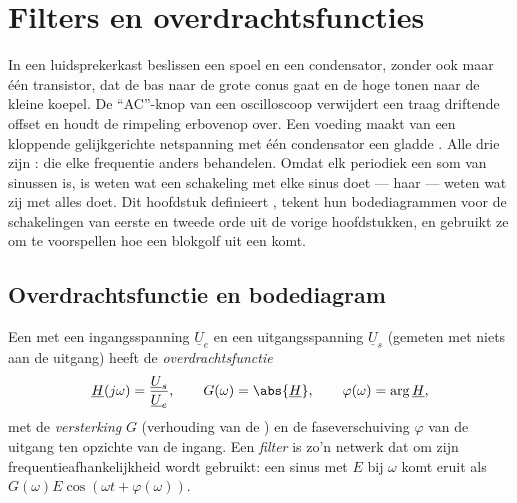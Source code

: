 \chapter{Filters en overdrachtsfuncties}\label{ch:b1:filters-transfer-functions}

In een luidsprekerkast beslissen een spoel en een condensator, zonder ook maar
één transistor, dat de bas naar de grote conus gaat en de hoge tonen naar de
kleine koepel. De ``AC''-knop van een oscilloscoop verwijdert een traag
driftende offset en houdt de rimpeling erbovenop over. Een voeding maakt van
een kloppende gelijkgerichte netspanning met één condensator een gladde .
Alle drie zijn \emph{}:  die elke frequentie
anders behandelen. Omdat elk periodiek  een som van sinussen is, is weten
wat een schakeling met elke sinus doet --- haar  --- weten
wat zij met alles doet. Dit hoofdstuk definieert , tekent
hun bodediagrammen voor de schakelingen van eerste en tweede orde uit de vorige
hoofdstukken, en gebruikt ze om te voorspellen hoe een blokgolf uit een 
komt.

\section{Overdrachtsfunctie en bodediagram}

\begin{definition}[Overdrachtsfunctie]\label{def:b1:filters-transfer-functions:H}
Een  met een ingangsspanning $\underline U_e$ en een
uitgangsspanning $\underline U_s$ (gemeten met niets aan de uitgang) heeft
de \emph{overdrachtsfunctie}
\[
\underline H(j\omega) = \frac{\underline U_s}{\underline U_e},
\qquad G(\omega) = \abs{\underline H}, \qquad \varphi(\omega) = \arg\underline H,
\]
met de \emph{versterking} $G$ (verhouding van de ) en de faseverschuiving $\varphi$
van de uitgang ten opzichte van de ingang. Een \emph{filter} is zo'n netwerk
dat om zijn frequentieafhankelijkheid wordt gebruikt: een sinus met  $E$ bij
$\omega$ komt eruit als $G(\omega)E\cos(\omega t + \varphi(\omega))$.
\end{definition}

